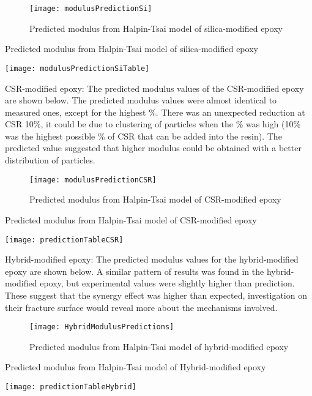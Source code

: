 \documentclass[numbers=noendperiod,chapterprefix=on]{icldt} %
\begin{document}
\begin{figure}[!htpb]
\centering
\texttt{[image: modulusPredictionSi]}
\caption{Predicted modulus from Halpin-Tsai model of silica-modified epoxy}
\end{figure}

\begin{table}[!htpb]
\centering
\caption{Predicted modulus from Halpin-Tsai model of silica-modified epoxy} %
\texttt{[image: modulusPredictionSiTable]}
\end{table}

CSR-modified epoxy: 
\newline
The predicted modulus values of the CSR-modified epoxy are shown below. The predicted modulus values were almost identical to measured ones, except for the highest \%. There was an unexpected reduction at CSR 10\%, it could be due to clustering of particles when the \% was high (10\% was the highest possible \% of CSR that can be added into the resin). The predicted value suggested that higher modulus could be obtained with a better distribution of particles. 

\begin{figure}[!htpb]
\centering
\texttt{[image: modulusPredictionCSR]}
\caption{Predicted modulus from Halpin-Tsai model of CSR-modified epoxy}
\end{figure}

\begin{table}[!htpb]
\centering
\caption{Predicted modulus from Halpin-Tsai model of CSR-modified epoxy } %
\texttt{[image: predictionTableCSR]}
\end{table}

Hybrid-modified epoxy:
\newline
The predicted modulus values for the hybrid-modified epoxy are shown below. A similar pattern of results was found in the hybrid-modified epoxy, but experimental values were slightly higher than prediction. These suggest that the synergy effect was higher than expected, investigation on their fracture surface would reveal more about the mechanisms involved. 

\begin{figure}[!htpb]
\centering
\texttt{[image: HybridModulusPredictions]}
\caption{Predicted modulus from Halpin-Tsai model of hybrid-modified epoxy }
\end{figure}

\begin{table}[!htpb]
\centering
\caption{Predicted modulus from Halpin-Tsai model of Hybrid-modified epoxy } %
\texttt{[image: predictionTableHybrid]}
\end{table}
\end{document}
